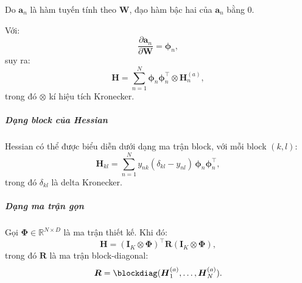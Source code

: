 Do $\boldsymbol{a}_n$ là hàm tuyến tính theo $\boldsymbol{W}$, đạo hàm bậc hai
của $\boldsymbol{a}_n$ bằng 0.

Với: \begin{equation}
  \frac{\partial \boldsymbol{a}_n}{\partial \boldsymbol{W}} =
  \boldsymbol{\phi}_n,
\end{equation} suy ra: \begin{equation}
  \boldsymbol{H} = \sum_{n=1}^{N} \boldsymbol{\phi}_n
  \boldsymbol{\phi}_n^\intercal \otimes \boldsymbol{H}_n^{(a)},
\end{equation} trong đó $\otimes$ kí hiệu tích Kronecker.

\subparagraph{Dạng block của Hessian}

Hessian có thể được biểu diễn dưới dạng ma trận block, với mỗi block $(k,l)$:
\begin{equation}
  \boldsymbol{H}_{kl} = \sum_{n=1}^{N} y_{nk}(\delta_{kl} - y_{nl})\,
  \boldsymbol{\phi}_n \boldsymbol{\phi}_n^\intercal,
\end{equation} trong đó $\delta_{kl}$ là delta Kronecker.

\subparagraph{Dạng ma trận gọn}

Gọi $\boldsymbol{\Phi} \in \mathbb{R}^{N \times D}$ là ma trận thiết kế. Khi
đó: \begin{equation}
  \boldsymbol{H} = (\boldsymbol{I}_K\otimes\boldsymbol{\Phi})^\intercal
  \boldsymbol{R} (\boldsymbol{I}_K\otimes\boldsymbol{\Phi}),
\end{equation} trong đó $\boldsymbol{R}$ là ma trận block-diagonal:
\begin{equation}
  \boldsymbol{R} = \blockdiag(\boldsymbol{H}_1^{(a)}, \dots,
  \boldsymbol{H}_N^{(a)}).
\end{equation}
